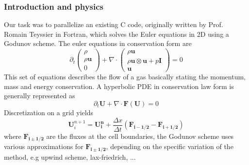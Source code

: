\documentclass{beamer}
\begin{document}
\begin{frame}
\frametitle{Introduction and physics}
\justify
\small{
Our task was to parallelize an existing C code, originally written by Prof. Romain Teyssier in Fortran, which solves the Euler equations in 2D using a Godunov scheme. The euler equations in conservation form are 
\begin{equation}
\partial_t
\begin{pmatrix} \rho    \\ \rho \mathbf{u}\\0\end{pmatrix}+\nabla\cdot\begin{pmatrix} \rho\mathbf{u}    \\ \rho\mathbf{u}\otimes\mathbf{u}+p\mathbf{I}\\ \mathbf{u}\end{pmatrix} = 0
\end{equation}
This set of equations describes the flow of a gas basically stating the momentum, mass and energy conservation. A hyperbolic PDE in conservation law form is generally represented as
\begin{equation}
\partial_t\mathbf{U} + \nabla\cdot\mathbf{F(U)} = 0
\label{eq:bb}
\end{equation}
Discretization on a grid yields
\begin{equation}
\mathbf{U}^{n+1}_i=\mathbf{U^n_i}+\frac{\Delta x}{\Delta t}(\mathbf{F_{i-1/2}}-\mathbf{F_{i+1/2}})
\label{eq:bc}
\end{equation}
where $\mathbf{F_{i\pm1/2}}$ are the fluxes at the cell boundaries, the Godunov scheme uses various approximations for $\mathbf{F_{i\pm1/2}}$, depending on the specific variation of the method, e.g upwind scheme, lax-friedrich, ... \\
}


\end{frame}
\end{document}
